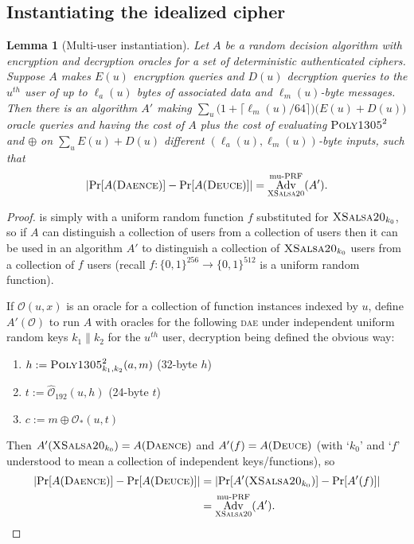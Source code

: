 \documentclass{article}
\newtheorem{lemma}{Lemma}
\def\operatorsc#1{{%
  \ifmmode\let\next=\operatorname\else\let\next=\relax\fi\next{\textsc{#1}}}}
\def\XSalsa#1/{\operatorsc{XSalsa#1}}
\def\Poly#1/{\operatorsc{Poly#1}}
\def\DAENCE/{\operatorsc{Daence}}
\def\DEUCE/{\operatorsc{Deuce}}
\def\muPRF{%
  \ifmmode\def\next{\operatorname{mu-PRF}}%
    \else\def\next/{mu-\textsc{prf}}%
  \fi\next}
\def\DAE{%
  \ifmmode\def\next{\operatorname{DAE}}%
    \else\def\next/{\textsc{dae}}%
  \fi\next}
\DeclareMathOperator{\Adv}{Adv}
\newcommand{\concat}{\mathbin\|}
\begin{document}
\subsection{Instantiating the idealized cipher}

\begin{lemma}[Multi-user instantiation]\label{mu-instance}
  Let $A$ be a random decision algorithm with encryption and
   decryption oracles for a \emph{set} of deterministic authenticated
   ciphers.
  Suppose $A$ makes $E(u)$ encryption queries and $D(u)$ decryption
   queries to the $u^{\mathit{th}}$ user of up to $\ell_a(u)$ bytes of
   associated data and $\ell_m(u)$-byte messages.
  Then there is an algorithm $A'$ making
   $\sum_u \bigl(1 + \lceil\ell_m(u)/64\rceil\bigr)
     \bigl(E(u) + D(u)\bigr)$
   oracle queries and having the cost of $A$ plus the cost of
   evaluating $\Poly1305/^2$ and $\oplus$ on
   $\sum_u E(u) + D(u)$
   different $(\ell_a(u), \ell_m(u))$-byte inputs,
   such that
  \[
    \lvert\Pr[A(\DAENCE/)] - \Pr[A(\DEUCE/)]\rvert
    = \Adv^{\muPRF}_{\XSalsa20/}(A').
  \]
\end{lemma}

\begin{proof}
  \DEUCE/ is simply \DAENCE/ with a uniform random function $f$
   substituted for $\XSalsa20/_{k_0}$, so if $A$ can distinguish a
   collection of \DAENCE/ users from a collection of \DEUCE/ users then
   it can be used in an algorithm $A'$ to distinguish a collection of
   $\XSalsa20/_{k_0}$ users from a collection of $f$ users (recall
   $f\colon \{0,1\}^{256} \to \{0,1\}^{512}$ is a
   uniform random function).

  If $\mathcal O(u,x)$ is an oracle for a collection of function
   instances indexed by $u$, define $A'(\mathcal O)$ to run $A$ with
   oracles for the following \DAE/ under independent uniform random keys
   $k_1 \concat k_2$ for the $u^{\mathit{th}}$ user, decryption being
   defined the obvious way:
  \begin{enumerate}
    \item $h := \Poly1305/^2_{k_1,k_2}(a, m)$
      \hfill (32-byte $h$)
    \item $t := \hat{\mathcal O}_{192}(u, h)$
      \hfill (24-byte $t$)
    \item $c := m \oplus \mathcal O_*(u, t)$
  \end{enumerate}
  Then $A'(\XSalsa20/_{k_0}) = A(\DAENCE/)$ and $A'(f) = A(\DEUCE/)$
   (with `$k_0$' and `$f$' understood to mean a collection of
   independent keys/functions), so
  \begin{align*}
    \lvert\Pr[A(\DAENCE/)] - \Pr[A(\DEUCE/)]\rvert
    &= \lvert\Pr[A'(\XSalsa20/_{k_0})] - \Pr[A'(f)]\rvert \\
    &= \Adv^{\muPRF}_{\XSalsa20/}(A').
    \qedhere
  \end{align*}
\end{proof}

\end{document}
